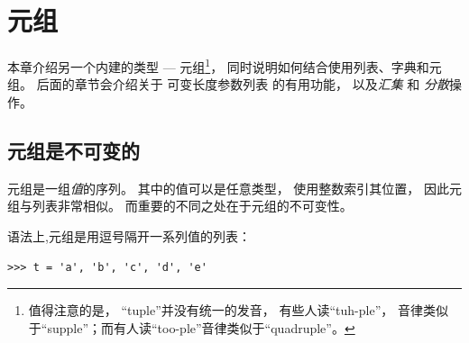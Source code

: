 

\chapter{元组}
\label{tuplechap}


本章介绍另一个内建的类型 --- 元组\footnote{值得注意的是， ``tuple''并没有统一的发音， 有些人读``tuh-ple''， 音律类似于``supple''；而有人读``too-ple''音律类似于``quadruple''。  }， 同时说明如何结合使用列表、字典和元组。
后面的章节会介绍关于 可变长度参数列表 的有用功能， 以及\emph{汇集} 和 \emph{分散}操作。

\section{元组是不可变的}
    

  

元组是一组\emph{值}的序列。
其中的值可以是任意类型， 使用整数索引其位置， 因此元组与列表非常相似。
而重要的不同之处在于元组的不可变性。


语法上,元组是用逗号隔开一系列值的列表：

\begin{lstlisting}
>>> t = 'a', 'b', 'c', 'd', 'e'
\end{lstlisting}
%

